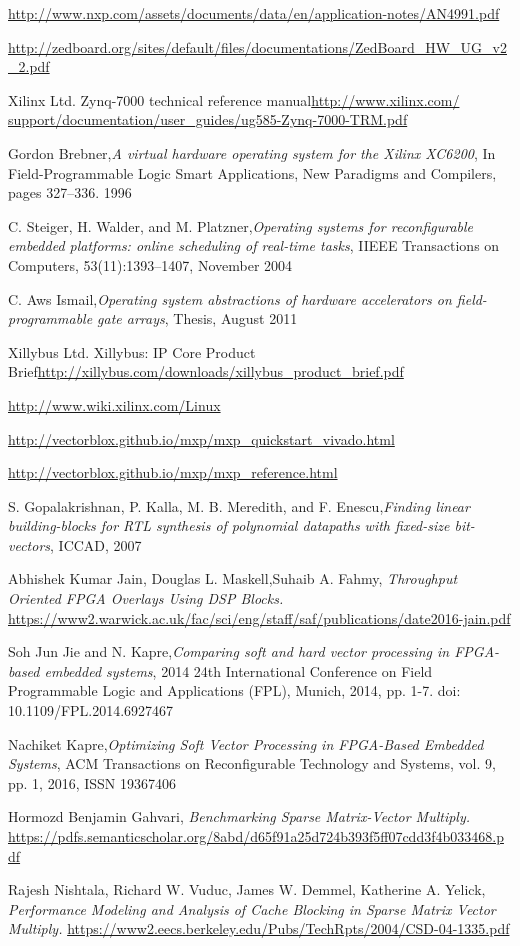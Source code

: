 \begin{thebibliography}{1}
\url{http://www.nxp.com/assets/documents/data/en/application-notes/AN4991.pdf}

\url{http://zedboard.org/sites/default/files/documentations/ZedBoard_HW_UG_v2_2.pdf}

Xilinx Ltd. Zynq-7000 technical reference manual\url{http://www.xilinx.com/
	support/documentation/user_guides/ug585-Zynq-7000-TRM.pdf}

Gordon Brebner,\emph{A virtual hardware operating system for the Xilinx XC6200}, In
Field-Programmable Logic Smart Applications, New Paradigms and Compilers,
pages 327–336. 1996

C. Steiger, H. Walder, and M. Platzner,\emph{Operating systems for reconfigurable
	embedded platforms: online scheduling of real-time tasks}, IIEEE Transactions
on Computers, 53(11):1393–1407, November 2004

C. Aws Ismail,\emph{Operating system abstractions of hardware accelerators on field-
	programmable gate arrays}, Thesis, August 2011

Xillybus Ltd. Xillybus: IP Core Product Brief\url{http://xillybus.com/downloads/xillybus_product_brief.pdf}

\url{http://www.wiki.xilinx.com/Linux}

\url{http://vectorblox.github.io/mxp/mxp_quickstart_vivado.html}

\url{http://vectorblox.github.io/mxp/mxp_reference.html}

S. Gopalakrishnan, P. Kalla, M. B. Meredith, and F. Enescu,\emph{Finding
	linear building-blocks for RTL synthesis of polynomial datapaths with
	fixed-size bit-vectors}, ICCAD, 2007

Abhishek Kumar Jain, Douglas L. Maskell,Suhaib A. Fahmy, \emph{Throughput Oriented FPGA Overlays Using DSP Blocks.}
\url{https://www2.warwick.ac.uk/fac/sci/eng/staff/saf/publications/date2016-jain.pdf}

Soh Jun Jie and N. Kapre,\emph{Comparing soft and hard vector processing in FPGA-based embedded systems}, 2014 24th International Conference on Field Programmable Logic and Applications (FPL), Munich, 2014, pp. 1-7.
doi: 10.1109/FPL.2014.6927467

Nachiket Kapre,\emph{Optimizing Soft Vector Processing in FPGA-Based Embedded Systems}, ACM Transactions on Reconfigurable Technology and Systems, vol. 9, pp. 1, 2016, ISSN 19367406

Hormozd Benjamin Gahvari, \emph{Benchmarking Sparse Matrix-Vector Multiply.}
\url{https://pdfs.semanticscholar.org/8abd/d65f91a25d724b393f5ff07cdd3f4b033468.pdf}

Rajesh Nishtala, Richard W. Vuduc, James W. Demmel, Katherine A. Yelick, \emph{Performance Modeling and Analysis of Cache Blocking in Sparse Matrix Vector Multiply.
}
\url{https://www2.eecs.berkeley.edu/Pubs/TechRpts/2004/CSD-04-1335.pdf}



\end{thebibliography}


